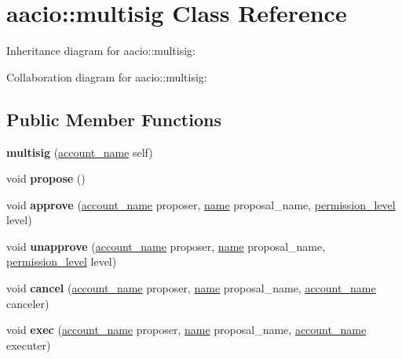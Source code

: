 \hypertarget{classaacio_1_1multisig}{}\section{aacio\+:\+:multisig Class Reference}
\label{classaacio_1_1multisig}


Inheritance diagram for aacio\+:\+:multisig\+:


Collaboration diagram for aacio\+:\+:multisig\+:
\subsection*{Public Member Functions}
\begin{DoxyCompactItemize}
\item 
\mbox{\label{classaacio_1_1multisig_a7d9ffd07bd63d51797e95b8d22b81a5e}} 
{\bfseries multisig} (\mbox{\hyperlink{structaacio_1_1chain_1_1name}{account\+\_\+name}} self)
\item 
\mbox{\label{classaacio_1_1multisig_ab7b815f089d2ae901ca8bff28f9d8fe6}} 
void {\bfseries propose} ()
\item 
\mbox{\label{classaacio_1_1multisig_ad5dc363c0cd5ff766edfd5ef9acd5a59}} 
void {\bfseries approve} (\mbox{\hyperlink{structaacio_1_1chain_1_1name}{account\+\_\+name}} proposer, \mbox{\hyperlink{structaacio_1_1name}{name}} proposal\+\_\+name, \mbox{\hyperlink{structaacio_1_1permission__level}{permission\+\_\+level}} level)
\item 
\mbox{\label{classaacio_1_1multisig_aea02d356a71fd7a9c87152d8ec4b2098}} 
void {\bfseries unapprove} (\mbox{\hyperlink{structaacio_1_1chain_1_1name}{account\+\_\+name}} proposer, \mbox{\hyperlink{structaacio_1_1name}{name}} proposal\+\_\+name, \mbox{\hyperlink{structaacio_1_1permission__level}{permission\+\_\+level}} level)
\item 
\mbox{\label{classaacio_1_1multisig_af451a06c845fe65da71b826678a8ec39}} 
void {\bfseries cancel} (\mbox{\hyperlink{structaacio_1_1chain_1_1name}{account\+\_\+name}} proposer, \mbox{\hyperlink{structaacio_1_1name}{name}} proposal\+\_\+name, \mbox{\hyperlink{structaacio_1_1chain_1_1name}{account\+\_\+name}} canceler)
\item 
\mbox{\label{classaacio_1_1multisig_aaa8fbf3de0a01d992e4b86d966192473}} 
void {\bfseries exec} (\mbox{\hyperlink{structaacio_1_1chain_1_1name}{account\+\_\+name}} proposer, \mbox{\hyperlink{structaacio_1_1name}{name}} proposal\+\_\+name, \mbox{\hyperlink{structaacio_1_1chain_1_1name}{account\+\_\+name}} executer)
\end{DoxyCompactItemize}
